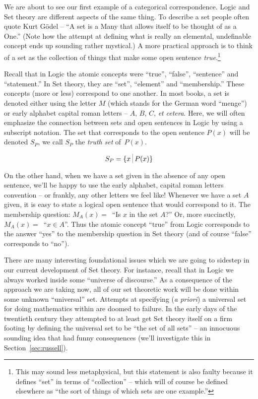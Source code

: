 We are about to see our first example of a categorical correspondence.
Logic and Set theory are different aspects of the same thing.  To
describe a set people often quote 
 Kurt G\"{o}del -- 
``A set is a Many that allows itself to be thought of as a One.''  (Note
how the attempt at defining what is really an elemental, undefinable
concept ends up sounding rather mystical.)  A more practical approach is
to think of a set as the collection of things that make some open sentence
\emph{true}.\footnote{This may sound less metaphysical,
but this statement is also faulty because it defines ``set'' in terms of ``collection'' -- which will of course be defined elsewhere as ``the sort of things of which sets are one example.''} 

Recall that in Logic the atomic concepts were ``true'', ``false'', 
``sentence'' and ``statement.''    In Set theory, they are ``set'', 
``element'' and ``membership.''  These concepts (more or less) correspond to
one another.  In most books, a set is denoted either using the letter $M$ 
(which stands for the German word ``menge'') or early alphabet capital roman 
letters --
$A$, $B$, $C$, \emph{et cetera}.  Here, we will often emphasize the connection between
sets and open sentences in Logic by using a subscript notation.  The set that
corresponds to the open sentence $P(x)$ will be denoted $S_P$, we call
$S_P$ the  \emph{truth set} of~$P(x)$. 

\[ S_P = \{ x \suchthat P(x) \} \]


On the other hand, when we have a set given in the absence of any open 
sentence, we'll be happy to use the early alphabet, capital roman letters 
convention -- or frankly, any other letters we feel like!
Whenever we have a set $A$ given, it is easy to state a logical 
open sentence that would correspond to it.  The membership question: $M_A(x) =
\,$ ``Is $x$ in the set $A$?''  Or, more succinctly, 
$M_A(x) = \,$ ``$x \in A$''.   Thus the atomic concept ``true'' from Logic
corresponds to the answer ``yes'' to the membership question in Set theory
(and of course ``false'' corresponds to ``no'').

There are many interesting foundational issues which we are going to
sidestep in our current development of Set theory.  For instance,
recall that in Logic we always worked inside some 
``universe of discourse.''
As a consequence of the approach we are taking now, all of our set theoretic
work will be done within some unknown 
``universal'' set.  Attempts at 
specifying (\emph{a priori}) a universal set for doing mathematics within 
are doomed to failure.  In the early days of the twentieth century
they attempted to at least get Set theory itself on a firm footing by
defining the universal set to be ``the set of all sets'' -- an innocuous
sounding idea that had funny consequences (we'll investigate this in 
Section~\ref{sec:russell}).  

